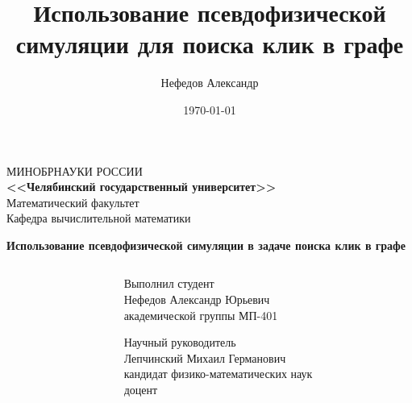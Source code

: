 \documentclass{beamer}
\title[Поиск клик]{Использование псевдофизической симуляции для поиска клик в графе} %
\author{Нефедов Александр} %
\institute[ЧелГУ] %
{
Челябинский Государственный Университет \\ %
\medskip
\textit{nefedov.alexander91@yandex.ru} %
}
\date{\today} %
\theoremstyle{plain}
\newtheorem{defi}{Определение}
\begin{document}

\begin{frame}
\setcounter{framenumber}{0}
  \begin{center}
    \tiny{МИНОБРНАУКИ РОССИИ} \\
    \tiny\textbf{<<Челябинский государственный университет>>}\\
    \tiny{Математический факультет} \\
    \tiny{Кафедра вычислительной математики}
    \vspace{6mm}

    {\normalsize\textbf{Использование псевдофизической симуляции в задаче поиска клик в графе}}
  \end{center}

    \vspace{4mm}

  \begin{columns}[t]
    \begin{column}[t]{5cm}
    \end{column}

    \begin{column}[t]{7cm}
      \small{Выполнил студент} \\
      \small{Нефедов Александр Юрьевич}\\
      \small{академической группы МП-401}\\
      \vspace{4mm}
  
      \small{Научный руководитель} \\
      \small{Лепчинский Михаил Германович}\\
      \small{кандидат физико-математических наук}\\
      \small{доцент} \\
    \end{column}
  \end{columns}
  \begin{center}
    \small\the\year
  \end{center}
\end{frame}

\end{document}
